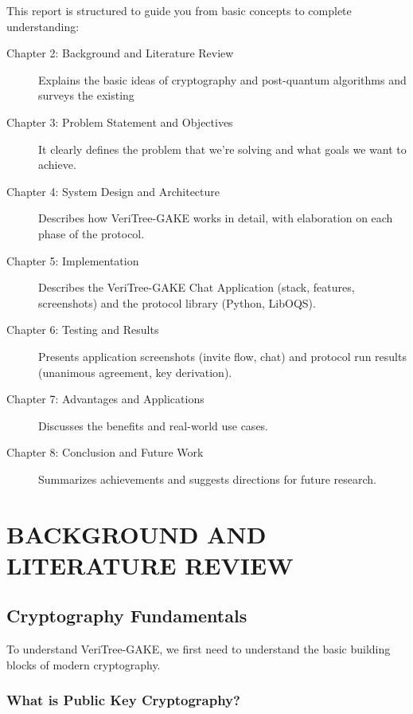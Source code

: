 \documentclass[12pt,a4paper]{report}
\begin{document}
This report is structured to guide you from basic concepts to complete understanding:

\begin{description}
\item[Chapter 2: Background and Literature Review] Explains the basic ideas of cryptography and post-quantum algorithms and surveys the existing

\item[Chapter 3: Problem Statement and Objectives] It clearly defines the problem that we're solving and what goals we want to achieve.

\item[Chapter 4: System Design and Architecture] Describes how VeriTree-GAKE works in detail, with elaboration on each phase of the protocol.

\item[Chapter 5: Implementation] Describes the VeriTree-GAKE Chat Application (stack, features, screenshots) and the protocol library (Python, LibOQS).

\item[Chapter 6: Testing and Results] Presents application screenshots (invite flow, chat) and protocol run results (unanimous agreement, key derivation).

\item[Chapter 7: Advantages and Applications] Discusses the benefits and real-world use cases.

\item[Chapter 8: Conclusion and Future Work] Summarizes achievements and suggests directions for future research.
\end{description}

\chapter{BACKGROUND AND LITERATURE REVIEW}

\section{Cryptography Fundamentals}

To understand VeriTree-GAKE, we first need to understand the basic building blocks of modern cryptography.

\subsection{What is Public Key Cryptography?}
\end{document}
